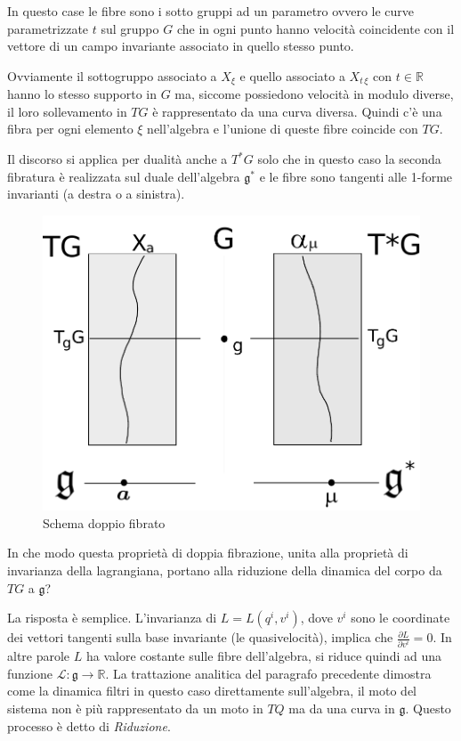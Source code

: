 \documentclass[11pt]{report}
\theoremstyle{plain}
\theoremstyle{definition}
\theoremstyle{remark}
\begin{document}
In questo case le fibre sono i sotto gruppi ad un parametro ovvero le curve parametrizzate $t$ sul gruppo $G$ che in ogni punto hanno velocità coincidente con il vettore di un campo invariante associato in quello stesso punto. 

 Ovviamente il sottogruppo associato a $X_{\xi}$ e quello associato a $X_{t\, \xi} $ con $t \in \mathbb{R}$ hanno lo stesso supporto in $G$ ma, siccome possiedono velocità in modulo diverse, il loro sollevamento in $TG$ è rappresentato da una curva diversa. Quindi c'è una fibra per ogni elemento $\xi$ nell'algebra e l'unione di queste fibre coincide con $TG$.

Il discorso si applica per dualità anche a $T^{\ast}G$ solo che in questo caso la seconda fibratura è realizzata sul duale dell'algebra $\mathfrak{g}^{\ast}$ e le fibre sono tangenti alle 1-forme invarianti (a destra o a sinistra).


\begin{figure}[!h]
		\label{fig:schemadoppiafibratura}
		\includegraphics[width=15cm,keepaspectratio]{immagini/Capitolo_V/schemadoppiafibratura.pdf}
			\caption{Schema doppio fibrato}
\end{figure}

In che modo questa proprietà di doppia fibrazione, unita alla proprietà di invarianza della lagrangiana, portano alla riduzione della dinamica del corpo da $TG$ a $\mathfrak{g}$?

La risposta è semplice. L'invarianza di $L = L(q^{i}, v^{i})$, dove $v^{i}$ sono le coordinate dei vettori tangenti sulla base invariante (le quasivelocità), implica che $\frac{\partial L}{\partial v^{i}} = 0$. In altre parole $L$ ha valore costante sulle fibre dell'algebra, si riduce quindi ad una funzione $\mathscr{L} : \mathfrak{g}\rightarrow \mathbb{R}$.
La trattazione analitica del paragrafo precedente dimostra come la dinamica filtri in questo caso direttamente sull'algebra, il moto del sistema non è più rappresentato da un moto in $TQ$ ma da una curva in $\mathfrak{g}$. Questo processo è detto di \emph{Riduzione}.
\end{document}
